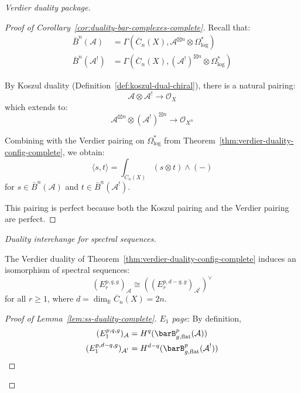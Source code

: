 \begin{proof}[Verdier duality package]
\begin{proof}[Proof of Corollary~\ref{cor:duality-bar-complexes-complete}]
Recall that:
\begin{align}
\bar{B}^n(\mathcal{A}) &= \Gamma(\overline{C}_n(X), \mathcal{A}^{\boxtimes n} \otimes
\Omega^*_{\log})\\
\bar{B}^n(\mathcal{A}^!) &= \Gamma(\overline{C}_n(X), (\mathcal{A}^!)^{\boxtimes n}
\otimes \Omega^*_{\log})
\end{align}

By Koszul duality (Definition~\ref{def:koszul-dual-chiral}), there is a natural pairing:
\begin{equation}
\mathcal{A} \otimes \mathcal{A}^! \to \mathcal{O}_X
\end{equation}
which extends to:
\begin{equation}
\mathcal{A}^{\boxtimes n} \otimes (\mathcal{A}^!)^{\boxtimes n} \to \mathcal{O}_{X^n}
\end{equation}

Combining with the Verdier pairing on $\Omega^*_{\log}$ from Theorem~\ref{thm:verdier-duality-config-complete}, we obtain:
\begin{equation}
\langle s, t \rangle = \int_{\overline{C}_n(X)} (s \otimes t) \wedge (-)
\end{equation}
for $s \in \bar{B}^n(\mathcal{A})$ and $t \in \bar{B}^n(\mathcal{A}^!)$.

This pairing is perfect because both the Koszul pairing and the Verdier pairing are
perfect.
\end{proof}

\emph{Duality interchange for spectral sequences.}

\begin{lemma}
\label{lem:ss-duality-complete}
The Verdier duality of Theorem~\ref{thm:verdier-duality-config-complete} induces an isomorphism
of spectral sequences:
\begin{equation}
(E_r^{p,q,g})_{\mathcal{A}} \cong ((E_r^{p,d-q,g})_{\mathcal{A}^!})^\vee
\end{equation}
for all $r \geq 1$, where $d = \dim_{\mathbb{R}} \overline{C}_n(X) = 2n$.
\end{lemma}

\begin{proof}[Proof of Lemma~\ref{lem:ss-duality-complete}]
\emph{$E_1$ page}: By definition,
\begin{align}
(E_1^{p,q,g})_{\mathcal{A}} &= H^q(\barB^p_{g,\mathrm{flat}}(\mathcal{A}))\\
(E_1^{p,d-q,g})_{\mathcal{A}^!} &= H^{d-q}(\barB^p_{g,\mathrm{flat}}(\mathcal{A}^!))
\end{align}


\end{proof}
\end{proof}
